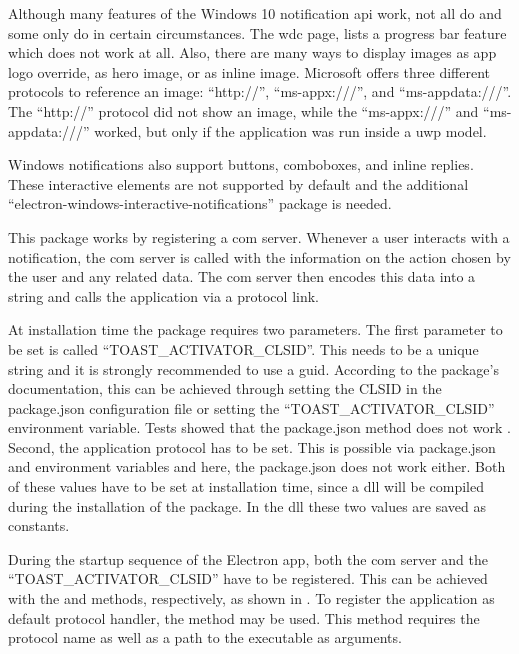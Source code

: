 Although many features of the Windows 10 notification \gls{api} work, not all do and some only do in certain circumstances. The \gls{wdc} page, \zB lists a progress bar feature which does not work at all. Also, there are many ways to display images \zB as app logo override, as hero image, or as inline image. Microsoft offers three different protocols to reference an image: \enquote{http://}, \enquote{ms-appx:///}, and \enquote{ms-appdata:///}. The \enquote{http://} protocol did not show an image, while the \enquote{ms-appx:///} and \enquote{ms-appdata:///} worked, but only if the application was run inside a \gls{uwp} model. \cite{toastContent}


Windows notifications also support buttons, comboboxes, and inline replies. These interactive elements are not supported by default and the additional \enquote{electron-windows-interactive-notifications} package is needed.

This package works by registering a \gls{com} server. Whenever a user interacts with a notification, the \gls{com} server is called with the information on the action chosen by the user and any related data. The \gls{com} server then encodes this data into a string and calls the application via a protocol link.

At installation time the package requires two parameters. The first parameter to be set is called \enquote{TOAST\_ACTIVATOR\_CLSID}. This needs to be a unique string and it is strongly recommended to use a \gls{guid}. According to the package's documentation, this can be achieved through setting the CLSID in the package.json configuration file or setting the \enquote{TOAST\_ACTIVATOR\_CLSID} environment variable. Tests showed that the package.json method does not work \cite{clsidPackageJson}. Second, the application protocol has to be set. This is possible via package.json and environment variables and here, the package.json does not work either. Both of these values have to be set at installation time, since a \gls{dll} will be compiled during the installation of the package. In the \gls{dll} these two values are saved as constants.

During the startup sequence of the Electron app, both the \gls{com} server and the \enquote{TOAST\_ACTIVATOR\_CLSID} have to be registered. This can be achieved with the  and  methods, respectively, as shown in . To register the application as default protocol handler, the  method may be used. This method requires the protocol name as well as a path to the executable as arguments.

